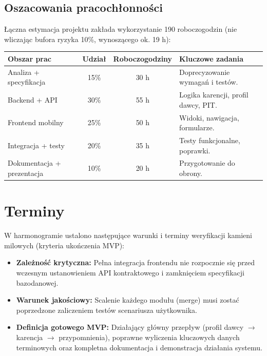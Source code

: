\documentclass[11pt, a4paper]{article}
\begin{document}
\subsection{Oszacowania pracochłonności}

Łączna estymacja projektu zakłada wykorzystanie 190 roboczogodzin (nie wliczając bufora ryzyka 10\%, wynoszącego ok. 19 h):

\begin{center}
\begin{tabularx}{\linewidth}{L{4cm} c c X}
  \toprule
  \textbf{Obszar prac} & \textbf{Udział} & \textbf{Roboczogodziny} & \textbf{Kluczowe zadania} \\
  \midrule
  Analiza + specyfikacja & 15\% & 30 h & Doprecyzowanie wymagań i testów. \\
  \addlinespace
  Backend + API & 30\% & 55 h & Logika karencji, profil dawcy, PIT. \\
  \addlinespace
  Frontend mobilny & 25\% & 50 h & Widoki, nawigacja, formularze. \\
  \addlinespace
  Integracja + testy & 20\% & 35 h & Testy funkcjonalne, poprawki. \\
  \addlinespace
  Dokumentacja + prezentacja & 10\% & 20 h & Przygotowanie do obrony. \\
  \bottomrule
\end{tabularx}
\end{center}

\section{Terminy}

W harmonogramie ustalono następujące warunki i terminy weryfikacji kamieni milowych (kryteria ukończenia MVP):

\begin{itemize}
  \item \textbf{Zależność krytyczna:} Pełna integracja frontendu nie rozpocznie się przed wczesnym ustanowieniem API kontraktowego i zamknięciem specyfikacji bazodanowej.
  \item \textbf{Warunek jakościowy:} Scalenie każdego modułu (merge) musi zostać poprzedzone zaliczeniem testów scenariusza użytkownika.
  \item \textbf{Definicja gotowego MVP:} Działający główny przepływ (profil dawcy $\rightarrow$ karencja $\rightarrow$ przypomnienia), poprawne wyliczenia kluczowych danych terminowych oraz kompletna dokumentacja i demonstracja działania systemu.
\end{itemize}
\end{document}
